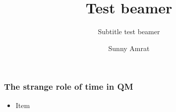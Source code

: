 \documentclass{beamer}
\title{Test beamer}
\subtitle{Subtitle test beamer}
\author{Sunny Amrat}
\begin{document}
\frame{\titlepage}
\begin{frame}
    \frametitle{The strange role of time in QM}
    \begin{itemize}
    		\item Item 
    \end{itemize}
\end{frame}
\end{document}
